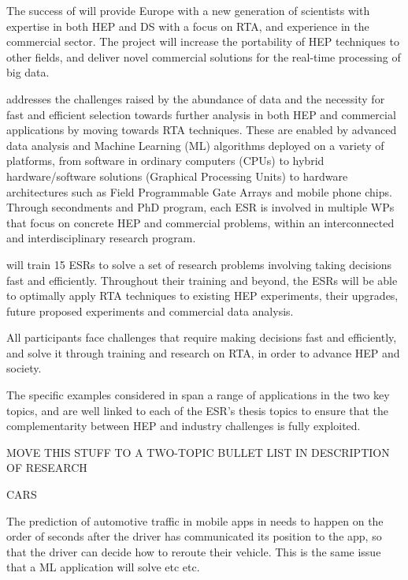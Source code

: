 

The success of \acronym  will provide Europe with a new generation of scientists with 
expertise in both HEP and DS with a focus on RTA, and experience in the commercial sector. 
The project will increase the portability of HEP techniques to 
other fields, and deliver novel commercial solutions for the real-time processing of big data.


\acronym addresses the challenges raised by the abundance of data 
and the necessity for fast and efficient selection towards further analysis in
both HEP and commercial applications by moving towards RTA techniques.
These are enabled by advanced data analysis and Machine Learning (ML) algorithms 
deployed on a variety of platforms, from software in ordinary computers (CPUs) 
to hybrid hardware/software solutions (Graphical Processing Units) to hardware architectures
such as Field Programmable Gate Arrays and mobile phone chips. %
Through secondments and PhD program, 
each ESR is involved in multiple WPs that focus on concrete HEP and commercial problems,
within an interconnected and interdisciplinary research program. 

\acronym will train 15 ESRs to solve a set of research problems involving 
taking decisions fast and efficiently. Throughout their training and beyond, 
the ESRs will be able to optimally apply RTA techniques 
to existing HEP experiments, their upgrades, future proposed experiments
and commercial data analysis. 

All \acronym participants face challenges that require making decisions fast and efficiently, 
and solve it through training and research on RTA, in order to advance HEP and society. 


The specific examples considered in \acronym 
span a range of applications in the two key topics, and are well linked to each of the ESR's thesis topics to ensure
that the complementarity between HEP and industry challenges is fully exploited. 

MOVE THIS STUFF TO A TWO-TOPIC BULLET LIST IN DESCRIPTION OF RESEARCH

CARS

The prediction of automotive traffic in mobile apps in \ximantisentity needs to happen on the order of seconds
after the driver has communicated its position to the app, so that the driver can decide how
to reroute their vehicle. This is the same issue that a ML application will solve etc etc. 

